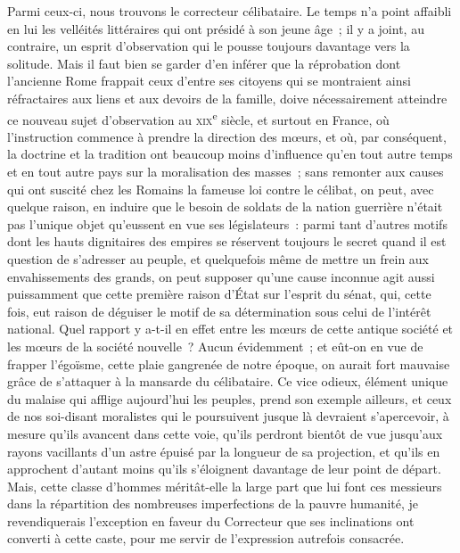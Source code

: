 \documentclass[french,twoside]{book} %
\begin{document}
Parmi ceux-ci, nous trouvons le correcteur célibataire. Le temps n’a point affaibli en lui les velléités littéraires qui ont présidé à son jeune âge ; il y a joint, au contraire, un esprit d’observation qui le pousse  toujours davantage vers la solitude. Mais il faut bien se garder d’en inférer que la réprobation dont l’ancienne Rome frappait ceux d’entre ses citoyens qui se montraient ainsi réfractaires aux liens et aux devoirs de la famille, doive nécessairement atteindre ce nouveau sujet d’observation au {\scshape xix}\textsuperscript{e} siècle, et surtout en France, où l’instruction commence à prendre la direction des mœurs, et où, par conséquent, la doctrine et la tradition ont beaucoup moins d’influence qu’en tout autre temps et en tout autre pays sur la moralisation des masses ; sans remonter aux causes qui ont suscité chez les Romains la fameuse loi contre le célibat, on peut, avec quelque raison, en induire que le besoin de soldats de la nation guerrière n’était pas l’unique objet qu’eussent en vue ses législateurs : parmi tant d’autres motifs dont les hauts dignitaires des empires se réservent toujours le secret quand il est question de  s’adresser au peuple, et quelquefois même de mettre un frein aux envahissements des grands, on peut supposer qu’une cause inconnue agit aussi puissamment que cette première raison d’État sur l’esprit du sénat, qui, cette fois, eut raison de déguiser le motif de sa détermination sous celui de l’intérêt national. Quel rapport y a-t-il en effet entre les mœurs de cette antique société et les mœurs de la société nouvelle ? Aucun évidemment ; et eût-on en vue de frapper l’égoïsme, cette plaie gangrenée de notre époque, on aurait fort mauvaise grâce de s’attaquer à la mansarde du célibataire. Ce vice odieux, élément unique du malaise qui afflige aujourd’hui les peuples, prend son exemple ailleurs, et ceux de nos soi-disant moralistes qui le poursuivent jusque là devraient s’apercevoir, à mesure qu’ils avancent dans cette voie, qu’ils perdront bientôt de vue jusqu’aux rayons vacillants  d’un astre épuisé par la longueur de sa projection, et qu’ils en approchent d’autant moins qu’ils s’éloignent davantage de leur point de départ. Mais, cette classe d’hommes méritât-elle la large part que lui font ces messieurs dans la répartition des nombreuses imperfections de la pauvre humanité, je revendiquerais l’exception en faveur du Correcteur que ses inclinations ont converti à cette caste, pour me servir de l’expression autrefois consacrée.\par
\end{document}
